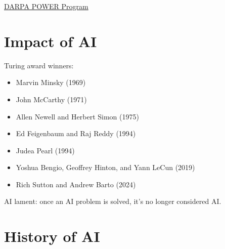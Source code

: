 \documentclass[11pt]{article}
\begin{document}
\href{https://www.darpa.mil/research/programs/power}{DARPA POWER Program}
\section{Impact of AI}
\label{sec:orgf22becd}

Turing award winners:

\begin{itemize}
\item Marvin Minsky (1969)
\item John McCarthy (1971)
\item Allen Newell and Herbert Simon (1975)
\item Ed Feigenbaum and Raj Reddy (1994)
\item Judea Pearl (1994)
\item Yoshua Bengio, Geoffrey Hinton, and Yann LeCun (2019)
\item Rich Sutton and Andrew Barto (2024)
\end{itemize}

AI lament: once an AI problem is solved, it's no longer considered AI.
\section{History of AI}
\label{sec:org36f7f80}
\end{document}
